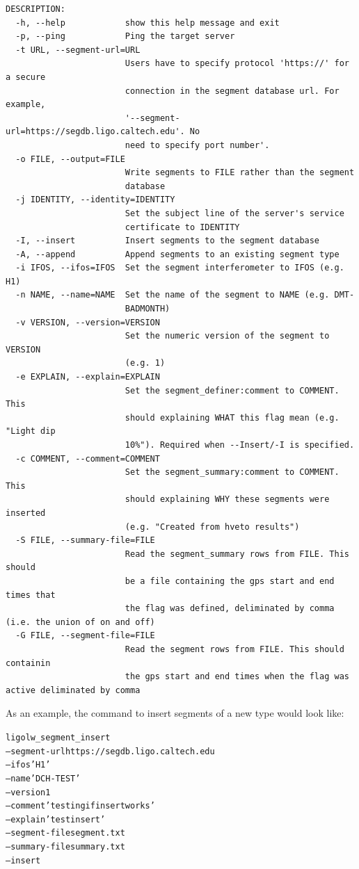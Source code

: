 {\small
\begin{verbatim}
DESCRIPTION:
  -h, --help            show this help message and exit
  -p, --ping            Ping the target server
  -t URL, --segment-url=URL
                        Users have to specify protocol 'https://' for a secure
                        connection in the segment database url. For example,
                        '--segment-url=https://segdb.ligo.caltech.edu'. No
                        need to specify port number'.
  -o FILE, --output=FILE
                        Write segments to FILE rather than the segment
                        database
  -j IDENTITY, --identity=IDENTITY
                        Set the subject line of the server's service
                        certificate to IDENTITY
  -I, --insert          Insert segments to the segment database
  -A, --append          Append segments to an existing segment type
  -i IFOS, --ifos=IFOS  Set the segment interferometer to IFOS (e.g. H1)
  -n NAME, --name=NAME  Set the name of the segment to NAME (e.g. DMT-
                        BADMONTH)
  -v VERSION, --version=VERSION
                        Set the numeric version of the segment to VERSION
                        (e.g. 1)
  -e EXPLAIN, --explain=EXPLAIN
                        Set the segment_definer:comment to COMMENT. This
                        should explaining WHAT this flag mean (e.g. "Light dip
                        10%"). Required when --Insert/-I is specified.
  -c COMMENT, --comment=COMMENT
                        Set the segment_summary:comment to COMMENT. This
                        should explaining WHY these segments were inserted
                        (e.g. "Created from hveto results")
  -S FILE, --summary-file=FILE
                        Read the segment_summary rows from FILE. This should
                        be a file containing the gps start and end times that
                        the flag was defined, deliminated by comma (i.e. the union of on and off)
  -G FILE, --segment-file=FILE
                        Read the segment rows from FILE. This should containin
                        the gps start and end times when the flag was active deliminated by comma
\end{verbatim}
%
As an example, the command to insert segments of a new type would 
look like:
%
\begin{alltt}
ligolw\_segment\_insert
  --segment-url https://segdb.ligo.caltech.edu
  --ifos 'H1'
  --name 'DCH-TEST'
  --version 1
  --comment 'testing if insert works'
  --explain 'test insert'
  --segment-file segment.txt
  --summary-file summary.txt
  --insert
\end{alltt}

}
